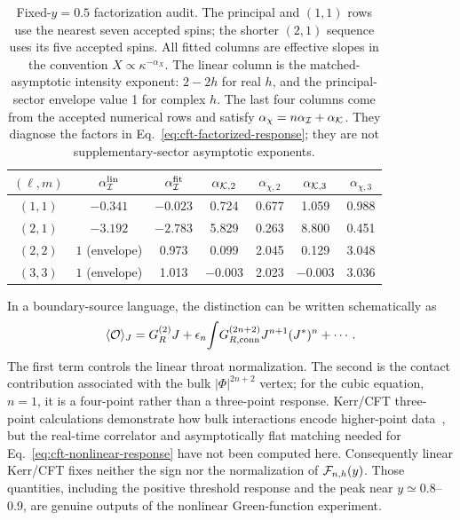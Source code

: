 \documentclass[aps,prd,twocolumn,10pt,nofootinbib,superscriptaddress,floatfix]{revtex4-2}
\begin{document}
\begin{table}[t]
\caption{Fixed-$y=0.5$ factorization audit.  The principal and $(1,1)$ rows use
the nearest seven accepted spins; the shorter $(2,1)$ sequence uses its five
accepted spins.  All fitted columns are effective slopes in the convention
$X\propto\kappa^{-\alpha_X}$.
The linear column is the matched-asymptotic intensity exponent: $2-2h$ for
real $h$, and the principal-sector envelope value 1 for complex $h$.  The
last four columns come from the accepted numerical rows and satisfy
$\alpha_\chi=n\alpha_{\cal I}+\alpha_{\cal K}$.  They diagnose the factors in
Eq.~\eqref{eq:cft-factorized-response}; they are not supplementary-sector
asymptotic exponents.}
\label{tab:cft-factorization}
\begin{ruledtabular}
\begin{tabular}{c c c c c c c}
$(\ell,m)$ & $\alpha_{\cal I}^{\rm lin}$ & $\alpha_{\cal I}^{\rm fit}$
& $\alpha_{{\cal K},2}$ & $\alpha_{\chi,2}$
& $\alpha_{{\cal K},3}$ & $\alpha_{\chi,3}$\\
\hline
$(1,1)$ & $-0.341$ & $-0.023$ & 0.724 & 0.677 & 1.059 & 0.988\\
$(2,1)$ & $-3.192$ & $-2.783$ & 5.829 & 0.263 & 8.800 & 0.451\\
$(2,2)$ & $1$ (envelope) & 0.973 & 0.099 & 2.045 & 0.129 & 3.048\\
$(3,3)$ & $1$ (envelope) & 1.013 & $-0.003$ & 2.023 & $-0.003$ & 3.036\\
\end{tabular}
\end{ruledtabular}
\end{table}

In a boundary-source language, the distinction can be written schematically
as
\begin{equation}
 \langle {\cal O}\rangle_J
 =G_R^{(2)}J+\epsilon_n\!\int\!G_{R,{\rm conn}}^{(2n+2)}
 J^{n+1}(J^*)^n+\cdots .
 \label{eq:cft-nonlinear-response}
\end{equation}
The first term controls the linear throat normalization.  The second is the
contact contribution associated with the bulk $|\Phi|^{2n+2}$ vertex; for the
cubic equation, $n=1$, it is a four-point rather than a three-point response.
Kerr/CFT three-point calculations demonstrate how bulk interactions encode
higher-point data~\cite{BeckerKerrCFT2011}, but the real-time correlator and
asymptotically flat matching needed for Eq.~\eqref{eq:cft-nonlinear-response}
have not been computed here.  Consequently linear Kerr/CFT fixes neither the
sign nor the normalization of ${\cal F}_{n,h}(y)$.  Those quantities, including
the positive threshold response and the peak near $y\simeq0.8$--0.9, are
genuine outputs of the nonlinear Green-function experiment.
\end{document}
